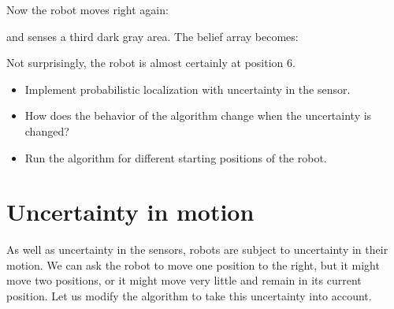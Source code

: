 \vspace{-1ex}
Now the robot moves right again:
\begin{center}
\end{center}
\vspace{-1ex}
\noindent{}and senses a third dark gray area. The belief array becomes:
\begin{center}
\end{center}
\vspace{-1ex}
Not surprisingly, the robot is almost certainly at position 6.

\begin{framed}
\begin{itemize}
\item Implement probabilistic localization with uncertainty in the sensor.
\item How does the behavior of the algorithm change when the uncertainty is changed?
\item Run the algorithm for different starting positions of the robot.
\end{itemize}
\end{framed}

\section{Uncertainty in motion}\label{s.uncertain-motion}

As well as uncertainty in the sensors, robots are subject to uncertainty in their motion. We can ask the robot to move one position to the right, but it might move two positions, or it might move very little and remain in its current position. Let us modify the algorithm to take this uncertainty into account.

